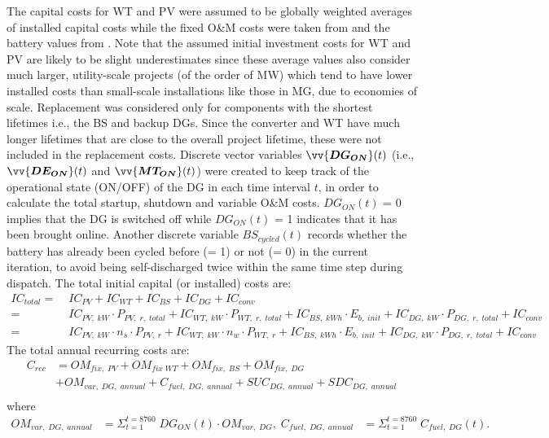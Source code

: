 \documentclass[final,3p,times]{elsarticle}
\begin{document}
The capital costs for WT and PV were assumed to be globally weighted averages of installed capital costs \cite{costs_irena} while the fixed O\&M costs were taken from \cite{kaabeche2011a} and the battery values from \cite{hu2017}. Note that the assumed initial investment costs for WT and PV are likely to be slight underestimates since these average values also consider much larger, utility-scale projects (of the order of MW) which tend to have lower installed costs than small-scale installations like those in MG, due to economies of scale. Replacement was considered only for components with the shortest lifetimes i.e., the BS and backup DGs. Since the converter and WT have much longer lifetimes that are close to the overall project lifetime, these were not included in the replacement costs. Discrete vector variables  $\vv{\bm{DG_{ON}}}(t)$ (i.e., $\vv{\bm{DE_{ON}}}(t)$ and $\vv{\bm{MT_{ON}}}(t)$) were created to keep track of the operational state (ON/OFF) of the DG in each time interval $t$, in order to calculate the total startup, shutdown and variable O\&M costs. $DG_{ON}(t)$ = 0 implies that the DG is switched off while $DG_{ON}(t)$ = 1 indicates that it has been brought online. Another discrete variable $BS_{cycled}(t)$ records whether the battery has already been cycled before (= 1) or not (= 0) in the current iteration, to avoid being self-discharged twice within the same time step during dispatch. 
The total initial capital (or installed) costs are: 
\begin{align*}
    IC_{total} = & \; IC_{PV} + IC_{WT} + IC_{BS} + IC_{DG} + IC_{conv} \\
    = & \; IC_{PV,\; kW} \cdot P_{PV,\;r,\;total} + IC_{WT,\;kW}\cdot P_{WT,\;r,\;total} + IC_{BS,\;kWh} \cdot E_{b,\; init} + IC_{DG,\;kW}\cdot P_{DG,\;r,\;total} + IC_{conv} \\
    = & \; IC_{PV,\; kW} \cdot n_s \cdot P_{PV,\;r} + IC_{WT,\;kW}\cdot n_w \cdot P_{WT,\;r} + IC_{BS,\;kWh} \cdot E_{b,\; init} + IC_{DG,\;kW}\cdot P_{DG,\;r,\;total} + IC_{conv}
\end{align*}
The total annual recurring costs are:
\begin{align*}
    C_{rec} & = OM_{fix,\;PV} + OM_{fix\;WT} + OM_{fix,\;BS} + OM_{fix,\;DG}   \\
    & + OM_{var, \; DG,\; annual} + C_{fuel,\; DG,\; annual} + SUC_{DG,\;annual} + SDC_{DG,\;annual}  \\
\end{align*}
where
\begin{align*}
    OM_{var, \; DG,\; annual} & = \Sigma_{t=1}^{t=8760} \; DG_{ON}(t) \cdot OM_{var, \; DG}, \; C_{fuel,\; DG,\; annual} & = \Sigma_{t=1}^{t=8760} \; C_{fuel,\; DG}(t). 
\end{align*}
\end{document}
